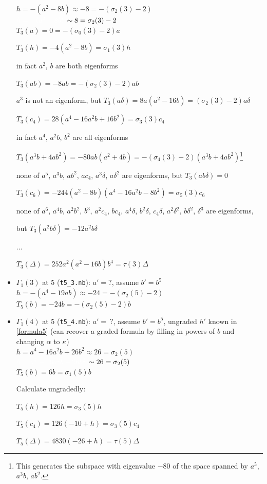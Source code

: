 \documentclass{rs}
\theoremstyle{definition}
\theoremstyle{remark}
\newcommand{\A}{\alpha}
\renewcommand{\d}{\delta}
\newcommand{\G}{\Gamma}
\newcommand{\K}{\kappa}
\newcommand{\si}{\sigma}
\newcommand{\T}{\tau}
\renewcommand{\=}{\approx}
\renewcommand{\-}{\sim}
\newcommand{\wt}[1]{\textcolor{white}{#1} \!~}
\numberwithin{equation}{section}
\numberwithin{thm}{section}
\begin{document}
\begin{itemize}
 $h = -(a^2 - 8 b) \= -8 = -(\si_2(3) - 2)$ \\
 $\wt{h = -(a^2 - 8 b)} \- 8 = \si_2(3) - 2$ \\

 $T_3(a) = 0 = -(\si_0(3) - 2) a$ 

 $T_3(h) = -4 (a^2 - 8 b) = \si_1(3) h$ 

 \hfill in fact $a^2$, $b$ are both eigenforms 

 $T_3(a b) = -8 a b = -(\si_2(3) - 2) a b$ 

 \hfill $a^3$ is not an eigenform, but $T_3(a \d) = 8 a (a^2 - 16 b) = (\si_2(3) - 2) a \d$ 

 $T_3(c_4) = 28 (a^4 - 16 a^2 b + 16 b^2) = \si_3(3) c_4$ 

 \hfill in fact $a^4$, $a^2 b$, $b^2$ are all eigenforms 

 $T_3(a^3 b + 4 a b^2) = -80 a b (a^2 + 4 b) =  -(\si_4(3) - 2) (a^3 b + 4 a b^2)$\footnote{This generates the subspace with eigenvalue $-80$ 
 of the space spanned by $a^5$, $a^3 b$, $a b^2$.  }

 \hfill none of $a^5$, $a^3 b$, $a b^2$, $a c_4$, $a^3 \d$, $a \d^2$ are eigenforms, but $T_3(a b \d) = 0$ 

 $T_3(c_6) = -244 (a^2 - 8 b) (a^4 - 16 a^2 b - 8 b^2) = \si_5(3) c_6$ 

 \hfill none of $a^6$, $a^4 b$, $a^2 b^2$, $b^3$, $a^2 c_4$, $b c_4$, $a^4 \d$, $b^2 \d$, $c_4 \d$, $a^2 \d^2$, $b \d^2$, $\d^3$ are eigenforms, 

 \hfill but $T_3(a^2 b \d) = -12 a^2 b \d$ 

 ... 

 $T_3(\Delta) = 252 a^2 (a^2 - 16 b) b^4 = \T(3) \Delta$ \\

 \item $\G_1(3)$ at 5 (\texttt{t5\_3.nb}): $a' = ?$, assume $b' = b^5$ \\

 $h = -(a^4 - 19 a b) \= -24 = -(\si_2(5) - 2)$ \\

 $T_5(b) = -24 b = -(\si_2(5) - 2) b$ \\

 \item $\G_1(4)$ at 5 (\texttt{t5\_4.nb}): $a' = ~\! ?$, assume $b' = b^5$, ungraded $h'$ known in \ref{formula5} 
 (can recover a graded formula by filling in powers of $b$ and changing $\A$ to $\K$) \\

 $h = a^4 - 16 a^2 b + 26 b^2 \= 26 = \si_2(5)$ \\
 $\wt{h = a^4 - 16 a^2 b + 26 b^2} \- 26 = \si_2(5)$ \\

 $T_5(b) = 6 b = \si_1(5) b$ 

 Calculate ungradedly: 

 $T_5(h) = 126 h = \si_3(5) h$ 

 $T_5(c_4) = 126 (-10 + h) = \si_3(5) c_4$ 

 $T_5(\Delta) = 4830 (-26 + h) = \T(5) \Delta$ 
\end{itemize}
\end{document}

